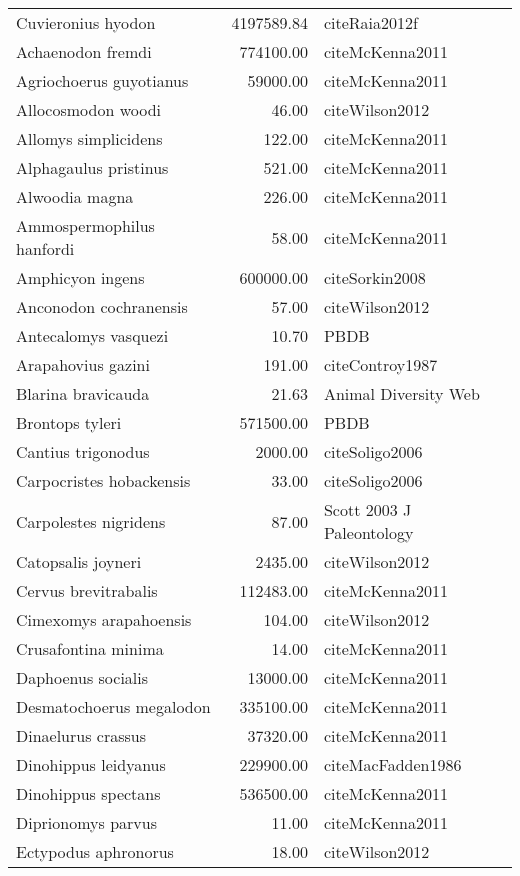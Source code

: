 \begin{table}[ht]
\begin{tabular}{lrl}
  Cuvieronius hyodon & 4197589.84 & cite{Raia2012f} \\ 
  Achaenodon fremdi & 774100.00 & cite{McKenna2011} \\ 
  Agriochoerus guyotianus & 59000.00 & cite{McKenna2011} \\ 
  Allocosmodon woodi & 46.00 & cite{Wilson2012} \\ 
  Allomys simplicidens & 122.00 & cite{McKenna2011} \\ 
  Alphagaulus pristinus & 521.00 & cite{McKenna2011} \\ 
  Alwoodia magna & 226.00 & cite{McKenna2011} \\ 
  Ammospermophilus hanfordi & 58.00 & cite{McKenna2011} \\ 
  Amphicyon ingens & 600000.00 & cite{Sorkin2008} \\ 
  Anconodon cochranensis & 57.00 & cite{Wilson2012} \\ 
  Antecalomys vasquezi & 10.70 & PBDB \\ 
  Arapahovius gazini & 191.00 & cite{Controy1987} \\ 
  Blarina bravicauda & 21.63 & Animal Diversity Web \\ 
  Brontops tyleri & 571500.00 & PBDB \\ 
  Cantius trigonodus & 2000.00 & cite{Soligo2006} \\ 
  Carpocristes hobackensis & 33.00 & cite{Soligo2006} \\ 
  Carpolestes nigridens & 87.00 & Scott 2003 J Paleontology \\ 
  Catopsalis joyneri & 2435.00 & cite{Wilson2012} \\ 
  Cervus brevitrabalis & 112483.00 & cite{McKenna2011} \\ 
  Cimexomys arapahoensis & 104.00 & cite{Wilson2012} \\ 
  Crusafontina minima & 14.00 & cite{McKenna2011} \\ 
  Daphoenus socialis & 13000.00 & cite{McKenna2011} \\ 
  Desmatochoerus megalodon & 335100.00 & cite{McKenna2011} \\ 
  Dinaelurus crassus & 37320.00 & cite{McKenna2011} \\ 
  Dinohippus leidyanus & 229900.00 & cite{MacFadden1986} \\ 
  Dinohippus spectans & 536500.00 & cite{McKenna2011} \\ 
  Diprionomys parvus & 11.00 & cite{McKenna2011} \\ 
  Ectypodus aphronorus & 18.00 & cite{Wilson2012} \\ 

\end{tabular}
\end{table}
